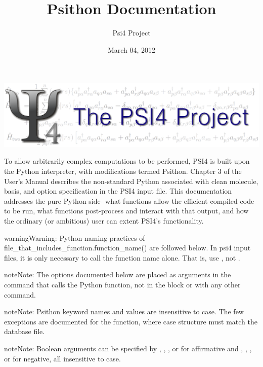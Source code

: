 \documentclass[letterpaper,10pt,english]{sphinxmanual}
\title{Psithon Documentation}
\date{March 04, 2012}
\author{Psi4 Project}
\begin{document}
\maketitle
\tableofcontents
{}\label{index::doc}
\includegraphics[width=1.000\linewidth]{PSI4_3.png}



To allow arbitrarily complex computations to be performed, PSI4 is built
upon the Python interpreter, with modifications termed Psithon. Chapter 3
of the User's Manual describes the non-standard Python associated with
clean molecule, basis, and option specification in the PSI4 input file.
This documentation addresses the pure Python side- what functions allow
the efficient compiled code to be run, what functions post-process and
interact with that output, and how the ordinary (or ambitious) user can
extent PSI4's functionality.

\begin{notice}{warning}{Warning:}
Python naming practices of file\_that\_includes\_function.function\_name()
are followed below. In psi4 input files, it is only necessary to call the
function name alone. That is, use , not .
\end{notice}

\begin{notice}{note}{Note:}
The options documented below are placed as arguments in the command that
calls the Python function, not in the  block or with any
other  command.
\end{notice}

\begin{notice}{note}{Note:}
Psithon keyword names and values are insensitive to case. The few
exceptions are documented for the  function, where case
structure must match the database file.
\end{notice}

\begin{notice}{note}{Note:}
Boolean arguments can be specified by , , , or 
for affirmative and , , , or  for negative,
all insensitive to case.
\end{notice}
\end{document}
